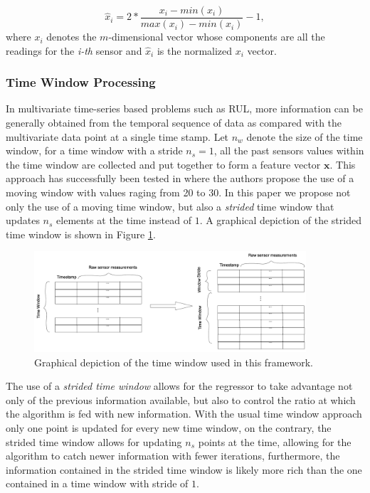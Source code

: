\documentclass[12pt]{IEEEtran}%
\begin{document}
\begin{equation}
\hat{x}_i = 2* \frac{x_i - min(x_i)}{max(x_i) - min(x_i)} - 1,
\label{eq:min_max_norm}
\end{equation}
where $x_i$ denotes the $m$-dimensional vector whose components are all the readings for the \textit{i-th} sensor and $\hat{x}_i$ is the normalized $x_i$ vector.

\subsubsection{Time Window Processing}

In multivariate time-series based problems such as RUL, more information can be generally obtained from the temporal sequence of data as compared with the multivariate data point at a single time stamp. Let $n_w$ denote the size of the time window, for a time window with a stride $n_s = 1$, all the past sensors values within the time window are collected and put together to form a feature vector $\mathbf{x}$. This approach has successfully been tested in \cite{Li2018, Lim2016} where the authors propose the use of a moving window with values raging from 20 to 30. In this paper we propose not only the use of a moving time window, but also a \textit{strided} time window that updates $n_s$ elements at the time instead of $1$. A graphical depiction of the strided time window is shown in Figure \ref{fig:time_window}.

\begin{figure}[!htb]
\centering
\includegraphics[width=0.9\textwidth]{../img/time_window.png}
\caption{Graphical depiction of the time window used in this framework.}
\label{fig:time_window}
\end{figure}

The use of a \textit{strided time window} allows for the regressor to take advantage not only of the previous information available, but also to control the ratio at which the algorithm is fed with new information. With the usual time window approach only one point is updated for every new time window, on the contrary, the strided time window allows for updating $n_s$ points at the time, allowing for the algorithm to catch newer information with fewer iterations, furthermore, the information contained in the strided time window is likely more rich than the one contained in a time window with stride of $1$.
\end{document}
